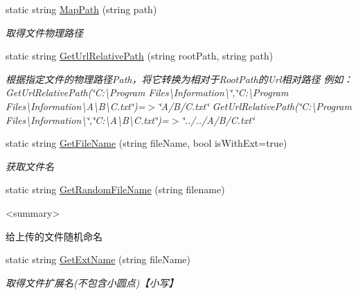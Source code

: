 \begin{DoxyCompactItemize}
static string \hyperlink{class_x_c_l_net_tools_1_1_file_handler_1_1_com_file_a98d090828121f63039a22838b065dfaa}{Map\-Path} (string path)
\begin{DoxyCompactList}\small\item\em 取得文件物理路径 \end{DoxyCompactList}\item 
static string \hyperlink{class_x_c_l_net_tools_1_1_file_handler_1_1_com_file_a87d1f27fa942e4682abc91f13ca79672}{Get\-Url\-Relative\-Path} (string root\-Path, string path)
\begin{DoxyCompactList}\small\item\em 根据指定文件的物理路径\-Path，将它转换为相对于\-Root\-Path的\-Url相对路径 例如： Get\-Url\-Relative\-Path(\char`\"{}\-C\-:\textbackslash{}\-Program Files\textbackslash{}\-Information\textbackslash{}\char`\"{},\char`\"{}\-C\-:\textbackslash{}\-Program Files\textbackslash{}\-Information\textbackslash{}\-A\textbackslash{}\-B\textbackslash{}\-C.\-txt\char`\"{})=$>$\char`\"{}\-A/\-B/\-C.\-txt\char`\"{} Get\-Url\-Relative\-Path(\char`\"{}\-C\-:\textbackslash{}\-Program Files\textbackslash{}\-Information\textbackslash{}\char`\"{},\char`\"{}\-C\-:\textbackslash{}\-A\textbackslash{}\-B\textbackslash{}\-C.\-txt\char`\"{})=$>$\char`\"{}../../\-A/\-B/\-C.\-txt\char`\"{} \end{DoxyCompactList}\item 
static string \hyperlink{class_x_c_l_net_tools_1_1_file_handler_1_1_com_file_ad13584770f8b195682bbaccf49d9f10d}{Get\-File\-Name} (string file\-Name, bool is\-With\-Ext=true)
\begin{DoxyCompactList}\small\item\em 获取文件名 \end{DoxyCompactList}\item 
static string \hyperlink{class_x_c_l_net_tools_1_1_file_handler_1_1_com_file_acc1c32c42fbd8c6e76f3a609af5e407f}{Get\-Random\-File\-Name} (string filename)
\begin{DoxyCompactList}\small\item\em \begin{DoxyVerb}<summary>
\end{DoxyVerb}
 给上传的文件随机命名 \end{DoxyCompactList}\item 
static string \hyperlink{class_x_c_l_net_tools_1_1_file_handler_1_1_com_file_ab93269a3eef81ae3afe9e502e202f209}{Get\-Ext\-Name} (string file\-Name)
\begin{DoxyCompactList}\small\item\em 取得文件扩展名(不包含小圆点)【小写】 \end{DoxyCompactList}\end{DoxyCompactItemize}


